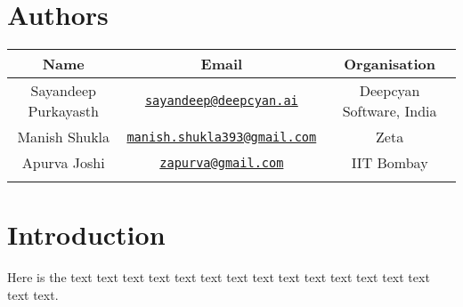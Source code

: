 \documentclass{ua_wgs_base}
\begin{document}
\chapter*{Authors\label{sec:authors}}

\begin{center}
\begin{tabular}{|c|c|c|}
\hline 
\textbf{Name} & \textbf{Email} & \textbf{Organisation}\tabularnewline
\hline
Sayandeep Purkayasth\footnotemark & \texttt{\href{mailto:sayandeep@deepcyan.ai}{sayandeep@deepcyan.ai}} & Deepcyan Software, India\tabularnewline
Manish Shukla & \texttt{\href{mailto:manish.shukla393@gmail.com}{manish.shukla393@gmail.com}} & Zeta\tabularnewline
Apurva Joshi & \texttt{\href{mailto:zapurva@gmail.com}{zapurva@gmail.com}} & IIT Bombay\tabularnewline
 &  & \tabularnewline
\hline 
\end{tabular}
\par\end{center}


\settowidth{\nomlabelwidth}{UTM-SP}
\printnomenclature{}\cleardoublepage{}

\chapter{Introduction}

Here is the text text text text text text text text text text text
text text text text text.
\end{document}
